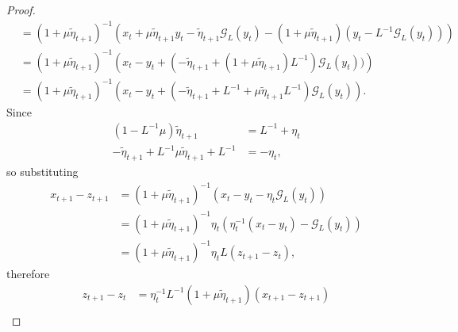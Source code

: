 \documentclass[12pt]{article}
\begin{document}
\begin{proof}
\begin{align*}
                &= 
                (1 + \mu \tilde \eta_{t + 1})^{-1}
                \left(
                    x_t + \mu \tilde \eta_{t + 1} y_t
                    - \tilde \eta_{t + 1} \mathcal G_L(y_t)
                    - (1 + \mu \tilde \eta_{t + 1})
                    (y_t - L^{-1}\mathcal G_L(y_t))
                \right)
                \\
                &= 
                (1 + \mu\tilde \eta_{t + 1})^{-1}
                \left(
                    x_t - y_t + 
                    (
                        -\tilde \eta_{t + 1} + 
                        (
                            1 + \mu\tilde \eta_{t + 1})L^{-1}
                        )
                        \mathcal G_L(y_t)
                    )
                \right)
                \\
                &= 
                (1 + \mu\tilde \eta_{t + 1})^{-1}
                \left(
                    x_t - y_t +     
                    (
                        - \tilde \eta_{t + 1} + L^{-1}
                        + \mu \tilde \eta_{t + 1}L^{-1}
                    )
                    \mathcal G_L(y_t)
                \right). 
            \end{align*}
            Since 
            \begin{align*}
                (1 - L^{-1}\mu)\tilde \eta_{t +1}
                &= L^{-1} + \eta_t 
                \\
                - \tilde \eta_{t + 1} + L^{-1}\mu \tilde \eta_{t + 1}
                + L^{-1}
                &= - \eta_t, 
            \end{align*}
            so substituting 
            \begin{align*}
                x_{t + 1} - z_{t + 1}
                &= 
                (1 + \mu \tilde \eta_{t + 1})^{-1}
                (x_t - y_t - \eta_t \mathcal G_L(y_t))
                \\
                &= (1 + \mu \tilde \eta_{t + 1})^{-1}
                \eta_t(\eta_{t}^{-1}(x_t - y_t) - \mathcal G_L(y_t))
                \\
                &= (1 + \mu \tilde \eta_{t + 1})^{-1}
                \eta_t L(z_{t + 1} - z_t), 
            \end{align*}
            therefore 
            \begin{align*}
                z_{t + 1} - z_t 
                &= 
                \eta^{-1}_tL^{-1}(1 + \mu \tilde \eta_{t + 1})(x_{t + 1} - z_{t + 1})
                \\

\end{align*}
\end{proof}
\end{document}
